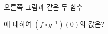 \noindent\begin{minipage}[t]{0.58\linewidth}\vspace{0pt}\raggedright 오른쪽 그림과 같은 두 함수\par\smallskip\end{minipage}\hfill\begin{minipage}[t]{0.4\linewidth}\vspace{0pt}\centering \resizebox{\ifdim\width>\linewidth\linewidth\else\width\fi}{!}{}\end{minipage}\par
\noindent {}\par{}\par\smallskip\noindent 에 대하여 $(f\circ g^{-1})(0)$의 값은?
